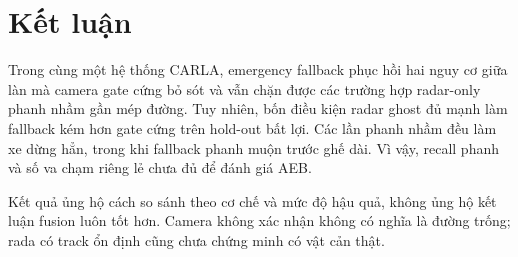 \documentclass[conference]{IEEEtran}
\begin{document}
\section{Kết luận}
Trong cùng một hệ thống CARLA, emergency fallback phục hồi hai nguy cơ giữa
làn mà camera gate cứng bỏ sót và vẫn chặn được các trường hợp radar-only
phanh nhầm gần mép đường. Tuy nhiên, bốn điều kiện radar ghost đủ mạnh làm
fallback kém hơn gate cứng trên hold-out bất lợi. Các lần phanh nhầm đều làm
xe dừng hẳn, trong khi fallback phanh muộn trước ghế dài. Vì vậy, recall
phanh và số va chạm riêng lẻ chưa đủ để đánh giá AEB.

Kết quả ủng hộ cách so sánh theo cơ chế và mức độ hậu quả, không ủng hộ kết
luận fusion luôn tốt hơn. Camera không xác nhận không có nghĩa là đường trống;
rada có track ổn định cũng chưa chứng minh có vật cản thật.



\end{document}
